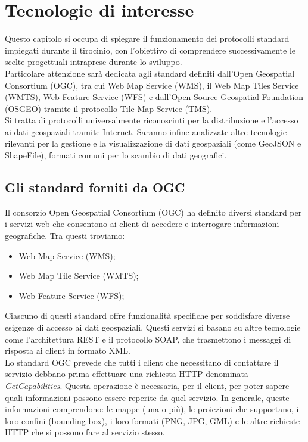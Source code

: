 \chapter{Tecnologie di interesse}
\label{cap:chapter2}

Questo capitolo si occupa di spiegare il funzionamento dei protocolli standard impiegati durante il tirocinio, con l'obiettivo di comprendere successivamente le scelte progettuali intraprese durante lo sviluppo.
\\Particolare attenzione sarà dedicata agli standard definiti dall'Open Geospatial Consortium (OGC), tra cui Web Map Service (WMS), il Web Map Tiles Service (WMTS), Web Feature Service (WFS) e dall'Open Source Geospatial Foundation (OSGEO) tramite il protocollo Tile Map Service (TMS).
\\Si tratta di protocolli universalmente riconosciuti per la distribuzione e l'accesso ai dati geospaziali tramite Internet. Saranno infine analizzate altre tecnologie rilevanti per la gestione e la visualizzazione di dati geospaziali (come GeoJSON e ShapeFile), formati comuni per lo scambio di dati geografici.

\section{Gli standard forniti da OGC}

Il consorzio Open Geospatial Consortium (OGC) ha definito diversi standard per i servizi web che consentono ai client di accedere e interrogare informazioni geografiche. Tra questi troviamo:
\begin{itemize}
      \item Web Map Service (WMS);
      \item Web Map Tile Service (WMTS);
      \item Web Feature Service (WFS);
\end{itemize}
Ciascuno di questi standard offre funzionalità specifiche per soddisfare diverse esigenze di accesso ai dati geospaziali. Questi servizi si basano su altre tecnologie come l'architettura REST e il protocollo SOAP, che trasmettono i messaggi di risposta ai client in formato XML.
\\Lo standard OGC prevede che tutti i client che necessitano di contattare il servizio debbano prima effettuare una richiesta HTTP denominata \textit{GetCapabilities}. Questa operazione è necessaria, per il client, per poter sapere quali informazioni possono essere reperite da quel servizio. In generale, queste informazioni comprendono: le mappe (una o più), le proiezioni che supportano, i loro confini (bounding box), i loro formati (PNG, JPG, GML) e le altre richieste HTTP che si possono fare al servizio stesso.


